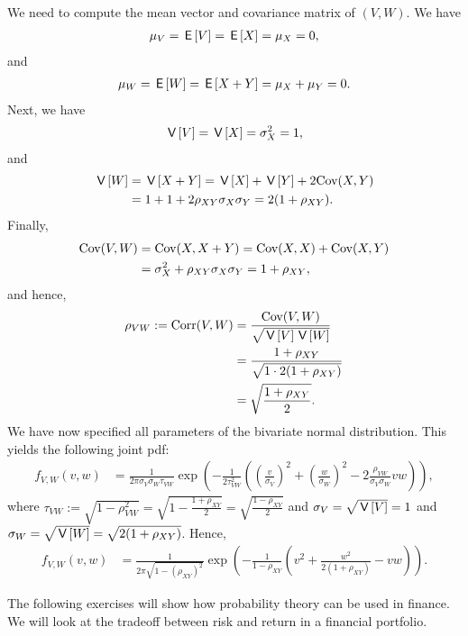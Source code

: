 \begin{exercise}
\begin{solution}
We need to compute the mean vector and covariance matrix of $(V,W)$. We have
\begin{align}
    \mu_V = \,\mathsf{E}\left[V\right] = \,\mathsf{E}\left[X\right] = \mu_X = 0,
\end{align}
and
\begin{align}
    \mu_W = \,\mathsf{E}\left[W\right] = \,\mathsf{E}\left[X + Y\right] = \mu_X + \mu_Y = 0.
\end{align}
Next, we have
\begin{align}
    \,\mathsf{V}\left[V\right] = \,\mathsf{V}\left[X\right] = \sigma_X^2 = 1,
\end{align}
and
\begin{align}
    \,\mathsf{V}\left[W\right] &= \,\mathsf{V}\left[X + Y\right] = \,\mathsf{V}\left[X\right] + \,\mathsf{V}\left[Y\right] + 2\text{Cov}(X,Y)\\
    &= 1 + 1 + 2 \rho_{XY} \sigma_X \sigma_Y = 2(1 + \rho_{XY}).
\end{align}
Finally,
\begin{align}
    \text{Cov}(V,W) &= \text{Cov}(X, X + Y) = \text{Cov}(X, X) + \text{Cov}(X, Y) \\
    &= \sigma_X^2 + \rho_{XY} \sigma_X \sigma_Y = 1 + \rho_{XY},
\end{align}
and hence,
\begin{align}
    \rho_{VW} := \text{Corr}(V,W) &= \frac{\text{Cov}(V,W)}{\sqrt{\,\mathsf{V}\left[V\right]\,\mathsf{V}\left[W\right]}} \\
    &= \frac{1 + \rho_{XY}}{\sqrt{1 \cdot 2(1 + \rho_{XY})}} \\
    &= \sqrt{\frac{1 + \rho_{XY}}{2}}.
\end{align}
We have now specified all parameters of the bivariate normal distribution. This yields the following joint pdf:
\begin{align}
    f_{V,W}(v,w) &= \frac{1}{2\pi \sigma_V \sigma_W \tau_{VW}} \exp\left(-\frac{1}{2 \tau_{VW}^2}\left(\left(\frac{v}{\sigma_V}\right)^2 + \left(\frac{w}{\sigma_W}\right)^2 - 2 \frac{\rho_{VW}}{\sigma_V \sigma_W} vw\right) \right),
\end{align}
where $\tau_{VW} := \sqrt{1 - \rho_{VW}^2} = \sqrt{1 - \frac{1 + \rho_{XY}}{2}} = \sqrt{\frac{1 - \rho_{XY}}{2}}$ and $\sigma_V = \sqrt{\,\mathsf{V}\left[V\right]} = 1$ and $\sigma_W = \sqrt{\,\mathsf{V}\left[W\right]} = \sqrt{2(1 + \rho_{XY})}$. Hence,
\begin{align}
    f_{V,W}(v,w) &= \frac{1}{2\pi \sqrt{1 - (\rho_{XY})^2}} \exp\left(-\frac{1}{1 - \rho_{XY}}\left(v^2 + \frac{w^2}{2(1 + \rho_{XY})}-vw\right)\right).
\end{align}

\end{solution}
\end{exercise}


The following exercises will show how probability theory can be used in finance. We will look at the tradeoff between risk and return in a financial portfolio.

